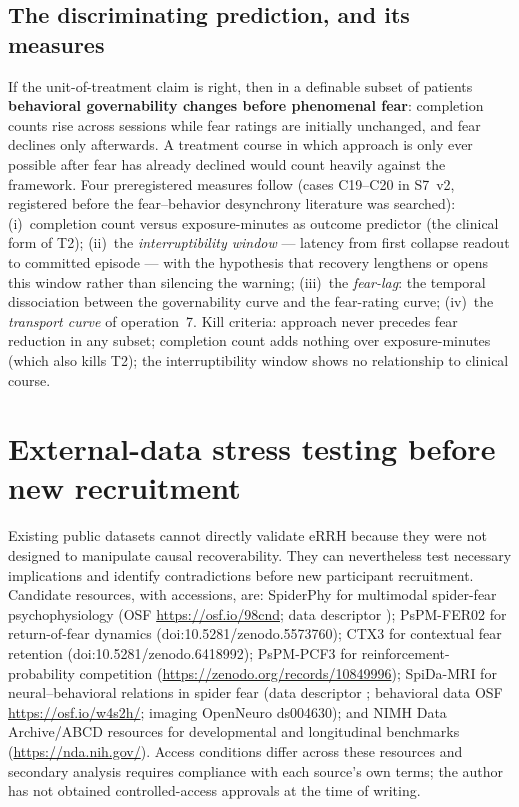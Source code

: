 \documentclass[9pt,twocolumn]{article}
\begin{document}
\subsection{The discriminating prediction, and its measures}
If the unit-of-treatment claim is right, then in a definable subset of patients \textbf{behavioral governability changes before phenomenal fear}: completion counts rise across sessions while fear ratings are initially unchanged, and fear declines only afterwards. A treatment course in which approach is only ever possible after fear has already declined would count heavily against the framework. Four preregistered measures follow (cases C19--C20 in S7~v2, registered before the fear--behavior desynchrony literature was searched): (i)~completion count versus exposure-minutes as outcome predictor (the clinical form of T2); (ii)~the \emph{interruptibility window} --- latency from first collapse readout to committed episode --- with the hypothesis that recovery lengthens or opens this window rather than silencing the warning; (iii)~the \emph{fear-lag}: the temporal dissociation between the governability curve and the fear-rating curve; (iv)~the \emph{transport curve} of operation~7. Kill criteria: approach never precedes fear reduction in any subset; completion count adds nothing over exposure-minutes (which also kills T2); the interruptibility window shows no relationship to clinical course.

\section{External-data stress testing before new recruitment}
\label{sec:external}
Existing public datasets cannot directly validate eRRH because they were not designed to manipulate causal recoverability. They can nevertheless test necessary implications and identify contradictions before new participant recruitment. Candidate resources, with accessions, are: SpiderPhy for multimodal spider-fear psychophysiology (OSF \url{https://osf.io/98cnd}; data descriptor \cite{lor2025}); PsPM-FER02 for return-of-fear dynamics (doi:10.5281/zenodo.5573760); CTX3 for contextual fear retention (doi:10.5281/zenodo.6418992); PsPM-PCF3 for reinforcement-probability competition (\url{https://zenodo.org/records/10849996}); SpiDa-MRI for neural--behavioral relations in spider fear (data descriptor \cite{zhang2025}; behavioral data OSF \url{https://osf.io/w4s2h/}; imaging OpenNeuro ds004630); and NIMH Data Archive/ABCD resources for developmental and longitudinal benchmarks (\url{https://nda.nih.gov/}). Access conditions differ across these resources and secondary analysis requires compliance with each source's own terms; the author has not obtained controlled-access approvals at the time of writing.
\end{document}
